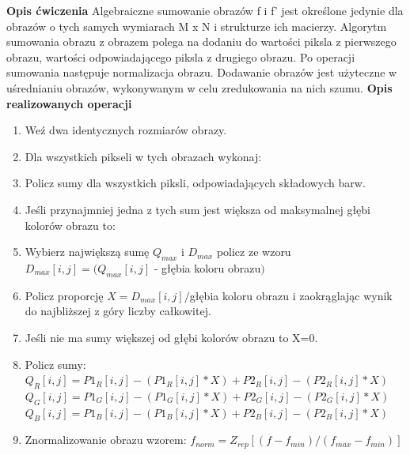 \documentclass[magisterska,openany]{pracadypl}
\begin{document}
\vspace{0.5cm}\textbf{\Large Opis ćwiczenia}
\vspace{0.25cm}\newline
Algebraiczne sumowanie obrazów f i f’ jest określone jedynie dla obrazów o tych samych wymiarach M x N i strukturze ich macierzy. Algorytm sumowania obrazu z obrazem polega na dodaniu do wartości piksla z pierwszego obrazu, wartości odpowiadającego piksla z drugiego obrazu. Po operacji sumowania następuje normalizacja obrazu. Dodawanie obrazów jest użyteczne w uśrednianiu obrazów, wykonywanym w celu zredukowania na nich szumu.
\newline
\newline
\textbf{\Large Opis realizowanych operacji}
\begin{enumerate}
\item Weź dwa identycznych rozmiarów obrazy.
\item Dla wszystkich pikseli w tych obrazach wykonaj:
\item Policz sumy dla wszystkich piksli, odpowiadających składowych barw.
\item Jeśli przynajmniej jedna z tych sum jest większa od maksymalnej głębi kolorów obrazu to:
\item Wybierz największą sumę $Q_{max}$ i $D_{max}$ policz ze wzoru
\newline $D_{max}[i,j]=(Q_{max}[i,j]$ - głębia koloru obrazu$)$
\item Policz proporcję $X=D_{max}[i,j]/$głębia koloru obrazu 
\newline i zaokrąglając wynik do najbliższej z góry liczby całkowitej.
\item Jeśli nie ma sumy większej od głębi kolorów obrazu to X=0.
\item Policz sumy: 
\newline $Q_R[i,j]=P1_R[i,j]-(P1_R[i,j]*X)+P2_R[i,j]-(P2_R[i,j]*X)$
$Q_G[i,j]=P1_G[i,j]-(P1_G[i,j]*X)+P2_G[i,j]-(P2_G[i,j]*X)$
$Q_B[i,j]=P1_B[i,j]-(P1_B[i,j]*X)+P2_B[i,j]-(P2_B[i,j]*X)$
\item Znormalizowanie obrazu wzorem:
\newline $f_{norm}=Z_{rep}[(f-f_{min})/(f_{max}-f_{min})]$
\end{enumerate}
\end{document}
